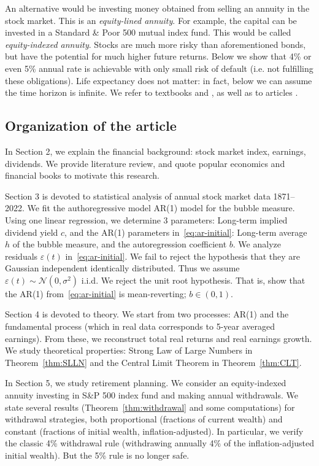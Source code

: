 \documentclass[12pt]{amsart}
\theoremstyle{definition}
\begin{document}
An alternative would be investing money obtained from selling an annuity in the stock market. This is an {\it equity-lined annuity}. For example, the capital can be invested in a Standard \& Poor 500 mutual index fund. This would be called {\it equity-indexed annuity}. Stocks are much more risky than aforementioned bonds, but have the potential for much higher future returns. Below we show that 4\% or even 5\% annual rate is achievable with only small risk of default (i.e. not fulfilling these obligations). Life expectancy does not matter: in fact, below we can assume the time horizon is infinite. We refer to textbooks \cite[Chapter 8]{ActuarialBook} and \cite{FengBook}, as well as to articles \cite{Anna, Guarantees, IndexedAnnuity}.

\subsection{Organization of the article} In Section 2, we explain the financial background: stock market index, earnings, dividends. We provide literature review, and quote popular economics and financial books to motivate this research. 

Section 3 is devoted to statistical analysis of annual stock market data 1871--2022. We fit the authoregressive model AR(1) model for the bubble measure. Using one linear regression, we determine 3 parameters: Long-term implied dividend yield $c$, and the AR(1) parameters in~\eqref{eq:ar-initial}: Long-term average $h$ of the bubble measure, and the autoregression coefficient $b$. We analyze residuals $\varepsilon(t)$ in~\eqref{eq:ar-initial}. We fail to reject the hypothesis that they are Gaussian independent identically distributed. Thus we assume $\varepsilon(t) \sim \mathcal N(0, \sigma^2)$ i.i.d. We reject the unit root hypothesis. That is, show that the AR(1) from~\eqref{eq:ar-initial} is mean-reverting; $b \in (0, 1)$. 

Section 4 is devoted to theory. We start from two processes: AR(1) and the fundamental process (which in real data corresponds to 5-year averaged earnings). From these, we reconstruct total real returns and real earnings growth. We study theoretical properties: Strong Law of Large Numbers in Theorem~\ref{thm:SLLN} and the Central Limit Theorem in Theorem~\ref{thm:CLT}. 

In Section 5, we study retirement planning. We consider an equity-indexed annuity investing in S\&P 500 index fund and making annual withdrawals. We state several results (Theorem~\ref{thm:withdrawal} and some computations) for withdrawal strategies, both proportional (fractions of current wealth) and constant (fractions of initial wealth, inflation-adjusted). In particular, we verify the classic 4\% withdrawal rule (withdrawing annually 4\% of the inflation-adjusted initial wealth). But the 5\% rule is no longer safe. 
\end{document}
